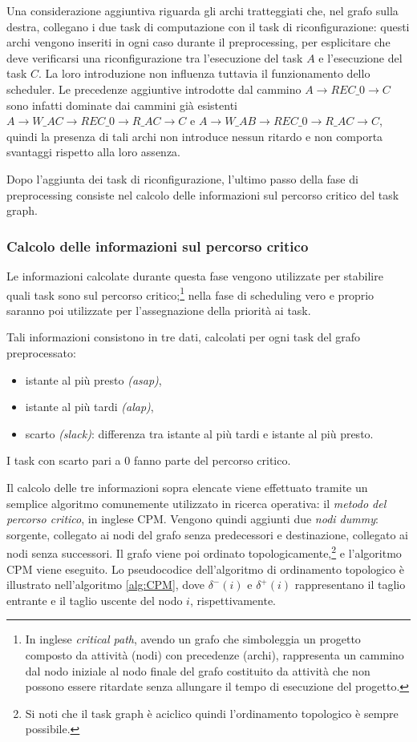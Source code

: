 Una considerazione 
aggiuntiva riguarda gli archi tratteggiati che, nel grafo sulla destra, 
collegano i due task di computazione con il task di riconfigurazione: questi 
archi vengono inseriti in ogni caso durante il preprocessing, per esplicitare 
che deve verificarsi una riconfigurazione tra l'esecuzione del task $A$ e 
l'esecuzione del task $C$. La loro introduzione non influenza tuttavia il 
funzionamento dello scheduler. Le precedenze aggiuntive introdotte dal cammino 
$A \rightarrow REC\_0 \rightarrow C$ sono infatti dominate dai cammini già 
esistenti $A \rightarrow W\_AC \rightarrow REC\_0 \rightarrow R\_AC \rightarrow 
C$ e $A \rightarrow W\_AB \rightarrow REC\_0 \rightarrow R\_AC \rightarrow C$, 
quindi la presenza di tali archi non introduce nessun ritardo e non comporta 
svantaggi rispetto alla loro assenza.

Dopo l'aggiunta dei task di riconfigurazione, l'ultimo passo della fase di 
preprocessing consiste nel calcolo delle informazioni sul percorso critico del 
task graph.


\subsubsection{Calcolo delle informazioni sul percorso critico}
Le informazioni calcolate durante questa fase vengono utilizzate per stabilire 
quali task sono sul percorso critico;\footnote{In inglese \emph{critical path}, 
avendo un grafo che simboleggia un progetto composto da attività (nodi) con 
precedenze (archi), rappresenta un cammino dal nodo iniziale al nodo finale del 
grafo costituito da attività che non possono essere ritardate senza allungare 
il tempo di esecuzione del progetto.} nella fase di scheduling vero e proprio
saranno poi utilizzate per l'assegnazione della priorità ai task.

Tali informazioni consistono in tre dati, calcolati per ogni task del grafo 
preprocessato:
\begin{itemize}
 \item istante al più presto \emph{(asap)},
 \item istante al più tardi \emph{(alap)},
 \item scarto \emph{(slack)}: differenza tra istante al più tardi e istante al 
più presto.
\end{itemize}
I task con scarto pari a $0$ fanno parte del percorso critico.

Il calcolo delle tre informazioni sopra elencate viene effettuato tramite un 
semplice algoritmo comunemente utilizzato in ricerca operativa: il \emph{metodo
del percorso critico}, in inglese \ac{CPM}.
Vengono quindi aggiunti due \emph{nodi dummy}: sorgente, collegato ai nodi del 
grafo senza predecessori e destinazione, collegato ai nodi senza successori.
Il grafo viene poi ordinato topologicamente,\footnote{Si noti che il task graph 
è aciclico quindi l'ordinamento topologico è sempre possibile.} e l'algoritmo 
\ac{CPM} viene eseguito. Lo pseudocodice dell'algoritmo di ordinamento 
topologico è illustrato nell'algoritmo \ref{alg:CPM}, dove $\delta^-(i)$ e 
$\delta^+(i)$ rappresentano il taglio entrante e il taglio uscente del nodo 
$i$, rispettivamente.

